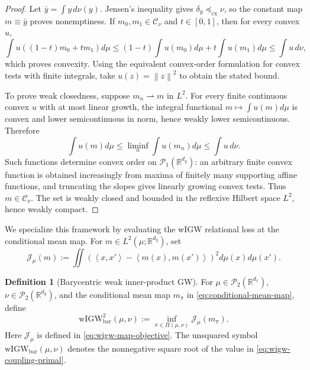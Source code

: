 \documentclass[11pt]{article}
\newcommand{\R}{\mathbb R}
\newcommand{\cP}{\mathcal P}
\newcommand{\ip}[2]{\left\langle #1,#2\right\rangle}
\newcommand{\norm}[1]{\left\lVert #1\right\rVert}
\newcommand{\cx}{\preceq_{\mathrm{cx}}}
\newcommand{\wIGW}{\mathrm{wIGW}_{\mathrm{bar}}}
\theoremstyle{plain}
\theoremstyle{definition}
\newtheorem{definition}[theorem]{Definition}
\theoremstyle{remark}
\begin{document}
\begin{proof}
Let $\bar y=\int y\,d\nu(y)$. Jensen's inequality gives
$\delta_{\bar y}\cx\nu$, so the constant map $m\equiv\bar y$ proves nonemptiness.
If $m_0,m_1\in\mathcal C_\nu$ and $t\in[0,1]$, then for every convex $u$,
\[
 \int u((1-t)m_0+tm_1)d\mu
 \le(1-t)\int u(m_0)d\mu+t\int u(m_1)d\mu
 \le\int u\,d\nu,
\]
which proves convexity. Using the equivalent convex-order formulation for convex
tests with finite integrals, take $u(z)=\norm z^2$ to obtain the stated bound.

To prove weak closedness, suppose $m_n\rightharpoonup m$ in $L^2$. For every
finite continuous convex $u$ with at most linear growth, the integral functional
$m\mapsto\int u(m)d\mu$ is convex and lower semicontinuous in norm, hence weakly
lower semicontinuous. Therefore
\[
  \int u(m)d\mu\le\liminf_n\int u(m_n)d\mu\le\int u\,d\nu.
\]
Such functions determine convex order on $\cP_1(\R^{d_y})$: an arbitrary finite
convex function is obtained increasingly from maxima of finitely many supporting
affine functions, and truncating the slopes gives linearly growing convex tests.
Thus $m\in\mathcal C_\nu$. The set is weakly closed and bounded in the reflexive
Hilbert space $L^2$, hence weakly compact.
\end{proof}

We specialize this framework by evaluating the wIGW relational loss at the
conditional mean map. For $m\in L^2(\mu;\R^{d_y})$, set
\begin{equation}\label{eq:wigw-map-objective}
 \mathcal J_\mu(m):=
 \iint\left(\ip{x}{x'}-\ip{m(x)}{m(x')}\right)^2d\mu(x)d\mu(x').
\end{equation}

\begin{definition}[Barycentric weak inner-product GW]\label{def:wigw}
For $\mu\in\cP_2(\R^{d_x})$, $\nu\in\cP_2(\R^{d_y})$, and the conditional mean
map $m_\pi$ in \eqref{eq:conditional-mean-map}, define
\begin{equation}\label{eq:wigw-coupling-primal}
  \wIGW^2(\mu,\nu)
  :=\inf_{\pi\in\Pi(\mu,\nu)}\mathcal J_\mu(m_\pi).
\end{equation}
Here $\mathcal J_\mu$ is defined in \eqref{eq:wigw-map-objective}.
The unsquared symbol \(\wIGW(\mu,\nu)\) denotes the nonnegative square root
of the value in \eqref{eq:wigw-coupling-primal}.
\end{definition}
\end{document}
